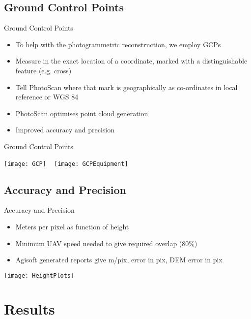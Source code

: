 \documentclass[table]{beamer}
\begin{document}
\subsection{Ground Control Points}

\begin{frame}{Ground Control Points}
    \begin{itemize}
        \item To help with the photogrammetric reconstruction, we employ GCPs
        \item Measure in the exact location of a coordinate, marked with a
            distinguishable feature (e.g. cross)
        \item Tell PhotoScan where that mark is geographically as co-ordinates
            in local reference or WGS 84
        \item PhotoScan optimises point cloud generation
        \item Improved accuracy and precision
    \end{itemize}
\end{frame}

\begin{frame}{Ground Control Points}
    \begin{center}
        \texttt{[image: GCP]} ~
        \texttt{[image: GCPEquipment]}
    \end{center}
\end{frame}

\subsection{Accuracy and Precision}

\begin{frame}{Accuracy and Precision}
    \begin{itemize}
        \item Meters per pixel as function of height
        \item Minimum UAV speed needed to give required overlap (80\%)
        \item Agisoft generated reports give m/pix, error in pix, DEM error in
            pix
    \end{itemize}
    \begin{center}
        \texttt{[image: HeightPlots]}
    \end{center}
\end{frame}

\section{Results}
\end{document}
